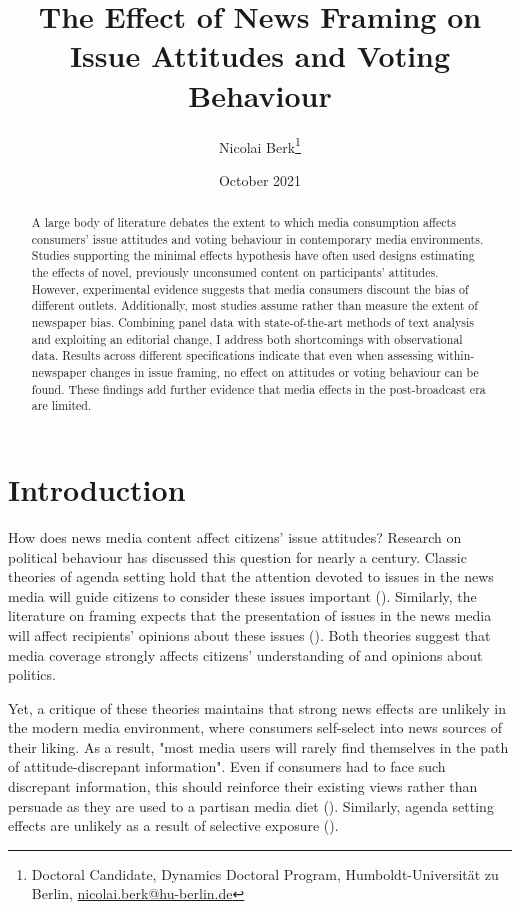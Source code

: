 \documentclass{article}
\title{The Effect of News Framing on Issue Attitudes and Voting Behaviour}
\author{Nicolai Berk\footnote{Doctoral Candidate, Dynamics Doctoral Program, Humboldt-Universität zu Berlin, \href{mailto:nicolai.berk@hu-berlin.de}{nicolai.berk@hu-berlin.de}}}
\date{October 2021}
\begin{document}
\maketitle


\medskip

\begin{abstract}
    A large body of literature debates the extent to which media consumption affects consumers' issue attitudes and voting behaviour in contemporary media environments. Studies supporting the minimal effects hypothesis have often used designs estimating the effects of novel, previously unconsumed content on participants' attitudes. However, experimental evidence suggests that media consumers discount the bias of different outlets. Additionally, most studies assume rather than measure the extent of newspaper bias. Combining panel data with state-of-the-art methods of text analysis and exploiting an editorial change, I address both shortcomings with observational data. Results across different specifications indicate that even when assessing within-newspaper changes in issue framing, no effect on attitudes or voting behaviour can be found. These findings add further evidence that media effects in the post-broadcast era are limited.
\end{abstract}


\section{Introduction}


How does news media content affect citizens' issue attitudes? Research on political behaviour has discussed this question for nearly a century. Classic theories of agenda setting hold that the attention devoted to issues in the news media will guide citizens to consider these issues important (\cite{McCombs1972}). Similarly, the literature on framing expects that the presentation of issues in the news media will affect recipients' opinions about these issues (\cite{Nelson1997}). Both theories suggest that media coverage strongly affects citizens' understanding of and opinions about politics.

Yet, a critique of these theories maintains that strong news effects are unlikely in the modern media environment, where consumers self-select into news sources of their liking. As a result, "most media users will rarely find themselves in the path of attitude-discrepant information". Even if consumers had to face such discrepant information, this should reinforce their existing views rather than persuade as they are used to a partisan media diet (\cite[724f]{Bennett2008}). Similarly, agenda setting effects are unlikely as a result of selective exposure (\cite{Lau2021}).
\end{document}
